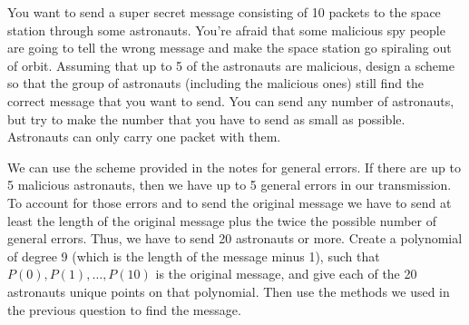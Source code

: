 \question You want to send a super secret message consisting of 10 
packets to the space station through some  astronauts. You’re afraid 
that some malicious spy people are going to tell the wrong message and 
make the space station go spiraling out of orbit. Assuming that up to 
5 of the astronauts are malicious, design a scheme so that the group of 
astronauts (including the malicious ones) still find the correct message 
that you want to send. You can send any number of astronauts, but try to 
make the number that you have to send as small as possible. Astronauts 
can only carry one packet with them.
\begin{solution}[2 in]
We can use the scheme provided in the notes for general errors. If 
there are up to 5 malicious astronauts, then we have up to 5 general 
errors in our transmission. To account for those errors and to send 
the original message we have to send at least the length of the original 
message plus the twice the possible number of general errors. Thus, 
we have to send 20 astronauts or more. Create a polynomial of degree 
9 (which is the length of the message minus 1), such that $P(0), P(1), 
\dotsc, P(10)$ is the original message, and give each of the 20 
astronauts unique points on that polynomial. Then use the methods we 
used in the previous question to find the message.
\end{solution}

